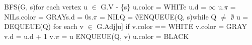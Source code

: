 \documentclass[preview]{standalone}
\begin{document}
\begin{center}
BFS(G, s)for each vertex u $\in$ G.V - \{s\}    u.color = WHITe    u.d = $\infty$    u.$\pi$ = NILs.color = GRAYs.d = 0s.$\pi$ = NILQ = $\emptyset$ENQUEUE(Q, s)while Q $\neq$ $\emptyset$    u = DEQUEUE(Q)    for each v $\in$ G.Adj[u]        if v.color == WHITE            v.color = GRAY            v.d = u.d + 1            v.$\pi$ = u            ENQUEUE(Q, v)    u.color = BLACK
\end{center}
\end{document}

